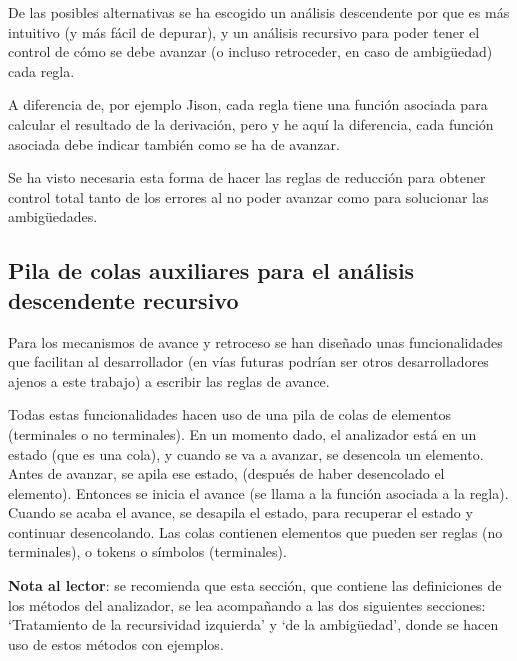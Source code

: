 \documentclass{report}
\begin{document}
	\vspace{10px}
	
	De las posibles alternativas se ha escogido un análisis descendente por que es más intuitivo (y más fácil de depurar), y un análisis recursivo para poder tener el control de cómo se debe avanzar (o incluso retroceder, en caso de ambigüedad) cada regla. 
	
	\vspace{10px}
	
	A diferencia de, por ejemplo Jison, cada regla tiene una función asociada para calcular el resultado de la derivación, pero y he aquí la diferencia, cada función asociada debe indicar también como se ha de avanzar.
	
	\vspace{10px}
	
	Se ha visto necesaria esta forma de hacer las reglas de reducción para obtener control total tanto de los errores al no poder avanzar como para solucionar las ambigüedades. 
	
	\subsection{Pila de colas auxiliares para el análisis descendente recursivo}
	
	Para los mecanismos de avance y retroceso se han diseñado unas funcionalidades que facilitan al desarrollador (en vías futuras podrían ser otros desarrolladores ajenos a este trabajo) a escribir las reglas de avance. 
	
	\vspace{10px}
	
	Todas estas funcionalidades hacen uso de una pila de colas de elementos (terminales o no terminales). En un momento dado, el analizador está en un estado (que es una cola), y cuando se va a avanzar, se desencola un elemento. Antes de avanzar, se apila ese estado, (después de haber desencolado el elemento). Entonces se inicia el avance (se llama a la función asociada a la regla). Cuando se acaba el avance, se desapila el estado, para recuperar el estado y continuar desencolando. Las colas contienen elementos que pueden ser reglas (no terminales), o tokens o símbolos (terminales).
	
	\vspace{10px}
	
	\textbf{Nota al lector}: se recomienda que esta sección, que contiene las definiciones de los métodos del analizador, se lea acompañando a las dos siguientes secciones: `Tratamiento de la recursividad izquierda' y `de la ambigüedad', donde se hacen uso de estos métodos con ejemplos. 
	
\end{document}

